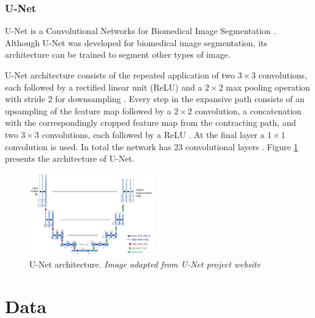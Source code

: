 \documentclass[10pt,twocolumn,letterpaper]{article}
\begin{document}
\subsubsection{U-Net} \label{sssec:unet}

U-Net is a Convolutional Networks for Biomedical Image Segmentation \cite{UNET} \cite{UNET_WEBSITE}. Although U-Net was developed for biomedical image segmentation, its architecture can be trained to segment other types of image.

U-Net architecture consists of the repeated application of two $3 \times 3$ convolutions, each followed by a rectified linear unit (ReLU) and a $2 \times 2$ max pooling operation with stride 2 for downsampling \cite{UNET}. Every step in the expansive path consists of an upsampling of the feature map followed by a $2 \times 2$ convolution, a concatenation with the correspondingly cropped feature map from the contracting path, and two $3 \times 3$ convolutions, each followed by a ReLU \cite{UNET}. At the final layer a $1 \times 1$ convolution is used. In total the network has 23 convolutional layers \cite{UNET}. Figure \ref{fig:unet} presents the  architecture of U-Net.

\begin{figure}[ht]
  \centering
  \includegraphics[width=0.48\textwidth]{unet.png}
  \caption{U-Net architecture. \textit{Image adapted from U-Net project website} \cite{UNET_WEBSITE} \cite{UNET}}
  \label{fig:unet}
\end{figure}


\section{Data} \label{sec:data}

\end{document}
